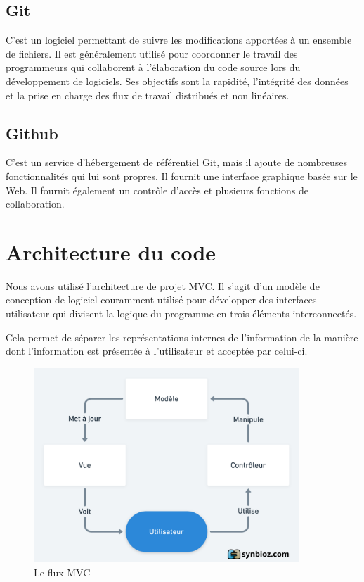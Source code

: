\documentclass[french, a4paper, 12pt]{report}
\begin{document}
		\subsection*{Git} C'est un logiciel permettant de suivre les modifications apportées à un ensemble de fichiers. Il est généralement utilisé pour coordonner le travail des programmeurs qui collaborent à l'élaboration du code source lors du développement de logiciels. Ses objectifs sont la rapidité, l'intégrité des données et la prise en charge des flux de travail distribués et non linéaires.

		\subsection*{Github} C'est un service d'hébergement de référentiel Git, mais il ajoute de nombreuses fonctionnalités qui lui sont propres. Il fournit une interface graphique basée sur le Web. Il fournit également un contrôle d'accès et plusieurs fonctions de collaboration.
	\section{Architecture du code} %
		Nous avons utilisé l'architecture de projet MVC. Il s'agit d'un modèle de conception de logiciel couramment utilisé pour développer des interfaces utilisateur qui divisent la logique du programme en trois éléments interconnectés.

Cela permet de séparer les représentations internes de l'information de la manière dont l'information est présentée à l'utilisateur et acceptée par celui-ci.
\begin{figure}[!h]
  \center
  \includegraphics[width=10cm]{mvc.png}
  \caption{Le flux MVC}
  \label{fig:fluxmvc}
\end{figure}
\end{document}
